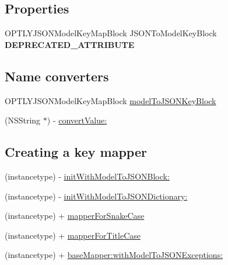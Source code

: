 \subsection*{Properties}
\begin{DoxyCompactItemize}
\item 
\mbox{\label{interface_o_p_t_l_y_j_s_o_n_key_mapper_a5afdda71b1f0aec06e78cc6a04c38eee}} 
O\+P\+T\+L\+Y\+J\+S\+O\+N\+Model\+Key\+Map\+Block J\+S\+O\+N\+To\+Model\+Key\+Block {\bfseries D\+E\+P\+R\+E\+C\+A\+T\+E\+D\+\_\+\+A\+T\+T\+R\+I\+B\+U\+TE}
\end{DoxyCompactItemize}
\subsection*{Name converters}
\begin{DoxyCompactItemize}
\item 
O\+P\+T\+L\+Y\+J\+S\+O\+N\+Model\+Key\+Map\+Block \mbox{\hyperlink{interface_o_p_t_l_y_j_s_o_n_key_mapper_a3547786009a069bf90bd8963c55e0747}{model\+To\+J\+S\+O\+N\+Key\+Block}}
\item 
(N\+S\+String $\ast$) -\/ \mbox{\hyperlink{interface_o_p_t_l_y_j_s_o_n_key_mapper_a03f3e316ddd485b8ccaa9c20f57bdc3d}{convert\+Value\+:}}
\end{DoxyCompactItemize}
\subsection*{Creating a key mapper}
\begin{DoxyCompactItemize}
\item 
(instancetype) -\/ \mbox{\hyperlink{interface_o_p_t_l_y_j_s_o_n_key_mapper_a6a9e531d97d165298a96e9dfe881f3e3}{init\+With\+Model\+To\+J\+S\+O\+N\+Block\+:}}
\item 
(instancetype) -\/ \mbox{\hyperlink{interface_o_p_t_l_y_j_s_o_n_key_mapper_a03784bce64f0202e8541be0127661575}{init\+With\+Model\+To\+J\+S\+O\+N\+Dictionary\+:}}
\item 
(instancetype) + \mbox{\hyperlink{interface_o_p_t_l_y_j_s_o_n_key_mapper_a5c00fb2ca67d42c231e36cd565a93a28}{mapper\+For\+Snake\+Case}}
\item 
(instancetype) + \mbox{\hyperlink{interface_o_p_t_l_y_j_s_o_n_key_mapper_a74f46610c5b02bada0184694af579db4}{mapper\+For\+Title\+Case}}
\item 
(instancetype) + \mbox{\hyperlink{interface_o_p_t_l_y_j_s_o_n_key_mapper_ae7748aaf30931ec4f8f36dd18845345f}{base\+Mapper\+:with\+Model\+To\+J\+S\+O\+N\+Exceptions\+:}}
\end{DoxyCompactItemize}


